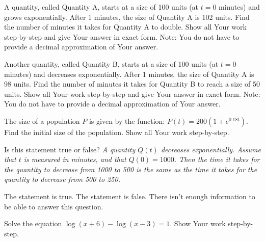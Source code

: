 \documentclass[11pt,answers]{exam}
\begin{document}
\begin{questions}


\addpoints



\question[2] A quantity, called Quantity A, starts at a size of 100 units (at $t=0$ minutes) and grows exponentially. After 1 minutes, the size of Quantity A is 102 units. Find the number of minutes it takes for Quantity A to double.    Show all Your work step-by-step and give Your answer in exact form. Note: You do not have to provide a decimal approximation of Your answer.


\fillwithdottedlines{3cm}

\question[2] Another quantity, called Quantity B, starts at a size of 100 units (at $t=0$ minutes) and decreases exponentially. After 1 minutes, the size of Quantity A is 98 units. Find the number of minutes it takes for Quantity B to reach a size of 50 units.     Show all Your work step-by-step and give Your answer in exact form. Note: You do not have to provide a decimal approximation of Your answer.

\fillwithdottedlines{3cm}

\question[2] The size of a population $P$ is given by the function: $\displaystyle P(t)=200(1+e^{0.18t})$. Find the initial size of the population. Show all Your work step-by-step.

\fillwithdottedlines{3cm}

\bonusquestion[1] Is this statement true or false? {\emph {A quantity $Q(t)$ decreases exponentially. Assume that $t$ is measured in minutes, and that $Q(0)=1000$. Then the time it takes for the quantity to decrease from 1000 to 500 is the same as the time it takes for the quantity to decrease from 500 to 250. }}

\begin{oneparchoices}
\choice The statement is true.
\choice The statement is false.
\choice There isn't enough information to be able to answer this question.
\end{oneparchoices}

\question[2] Solve the equation $\displaystyle \log(x+6)-\log(x-3)=1$. Show Your work step-by-step.

	\fillwithdottedlines{2cm}


\end{questions}
\end{document}
